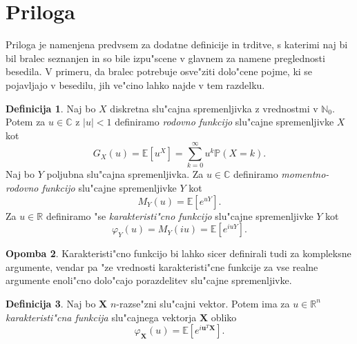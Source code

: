 \documentclass[12pt, a4paper, reqno]{amsart}
\theoremstyle{definition}
\newtheorem{definicija}{Definicija}[section]
\newtheorem{opomba}[definicija]{Opomba}
\theoremstyle{plain}
\newcommand{\R}{\mathbb{R}}
\newcommand{\N}{\mathbb{N}}
\newcommand{\E}{\mathbb{E}}
\newcommand{\Prob}{\mathbb{P}}
\newcommand{\1}{\mathds{1}}
\begin{document}
        \newpage

\section{Priloga}
    Priloga je namenjena predvsem za dodatne definicije in trditve, s katerimi naj bi bil bralec seznanjen in 
    so bile izpu"scene v glavnem za namene preglednosti besedila. V primeru, da bralec potrebuje osve"ziti dolo"cene pojme, ki 
    se pojavljajo v besedilu, jih ve"cino lahko najde v tem razdelku.
    \begin{definicija}
        Naj bo $X$ diskretna slu"cajna spremenljivka z vrednostmi v $\N_0$. Potem za $u\in\mathbb{C}$ 
        z $|u| < 1$ definiramo \textit{rodovno funkcijo} slu"cajne spremenljivke $X$ kot
        \begin{equation*}
            G_X(u) = \E\left[u^X\right] = \sum_{k = 0}^\infty u^k\Prob(X = k).
        \end{equation*}
        Naj bo $Y$ poljubna slu"cajna spremenljivka. Za $u\in\mathbb{C}$ definiramo
         \textit{momentno-rodovno funkcijo} slu"cajne spremenljivke $Y$ kot 
        \begin{equation*}
            M_Y(u) = \E\left[e^{uY}\right].
        \end{equation*} 
        Za $u\in\R$ definiramo "se \textit{karakteristi"cno funkcijo} slu"cajne spremenljivke $Y$ kot
        \begin{equation*}
            \varphi_Y(u) = M_Y(iu) =  \E\left[e^{iuY}\right].
        \end{equation*}
        \label{def:rodovneFunkcije}
    \end{definicija}

    \begin{opomba}
        Karakteristi"cno funkcijo bi lahko sicer definirali tudi za kompleksne argumente, vendar pa 
        "ze vrednosti karakteristi"cne funkcije za vse realne argumente enoli"cno dolo"cajo porazdelitev 
        slu"cajne spremenljivke. 
    \end{opomba}

    \begin{definicija}
        Naj bo $\boldsymbol{X}$ $n$-razse"zni slu"cajni vektor. Potem ima za $u\in\R^n$ \textit{karakteristi"cna 
        funkcija} slu"cajnega vektorja $\boldsymbol{X}$ obliko
        \begin{equation*}
            \varphi_{\boldsymbol{X}}(u) = \E\left[e^{i\boldsymbol{u}^T\boldsymbol{X}}\right].
        \end{equation*}
        \label{def:karakteristicnaSlucVektor}
    \end{definicija}
\end{document}
